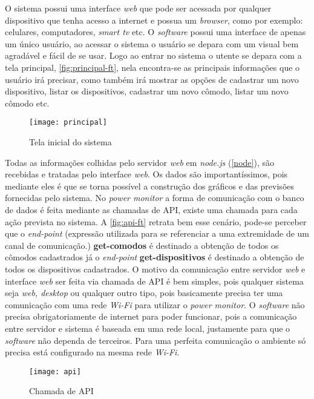 O sistema possui uma interface \textit{web} que pode ser acessada por qualquer dispositivo que tenha acesso a internet e possua um 
\textit{browser}, como por exemplo: celulares, computadores, \textit{smart tv} etc. O \textit{software} possui uma interface de apenas um único usuário, ao acessar o sistema o usuário se depara com um
visual bem agradável e fácil de se usar. Logo ao entrar no sistema o utente se depara com a tela principal, \autoref{fig:principal-ft}, nela encontra-se
as principais informações que o usuário irá precisar, como também irá mostrar as opções de cadastrar um novo dispositivo, listar os dispositivos, cadastrar um novo cômodo,
listar um novo cômodo etc.

\begin{figure}[h!]
	\texttt{[image: principal]}
	\centering
	\caption[Tela inicial do sistema]{Tela inicial do sistema}
	\label{fig:principal-ft}
\end{figure}
\FloatBarrier

Todas as informações colhidas pelo servidor \textit{web} em \textit{node.js} (\autoref{node}), são recebidas e tratadas pelo interface \textit{web}. Os dados
são importantíssimos, pois mediante eles é que se torna possível a construção dos gráficos e das previsões fornecidas pelo sistema. No \textit{power monitor}
a forma de comunicação com o banco de dados é feita mediante as chamadas de API, existe uma chamada para cada ação prevista no sistema. A \autoref{fig:api-ft}
retrata bem esse cenário, pode-se perceber que o \textit{end-point} (expressão utilizada para se referenciar a uma extremidade de um canal de comunicação.) 
\textbf{get-comodos} é destinado a obtenção de todos os cômodos cadastrados já o \textit{end-point} \textbf{get-dispositivos} é destinado a 
obtenção de todos os dispositivos cadastrados. O motivo da comunicação entre servidor \textit{web} e interface \textit{web}
ser feita via chamada de API é bem simples, pois qualquer sistema seja \textit{web, desktop} ou qualquer outro tipo, pois basicamente precisa ter uma comunicação com uma rede \textit{Wi-Fi}
para utilizar o \textit{power monitor}. O \textit{software} não precisa obrigatoriamente de internet para poder funcionar, pois a comunicação entre servidor e sistema é
baseada em uma rede local, justamente para que o \textit{software} não dependa de terceiros. Para uma perfeita comunicação o ambiente só precisa está configurado
na mesma rede \textit{Wi-Fi}. 

\begin{figure}[h!]
	\texttt{[image: api]}
	\centering
	\caption[Chamada de API]{Chamada de API}
	\label{fig:api-ft}
\end{figure}
\FloatBarrier

